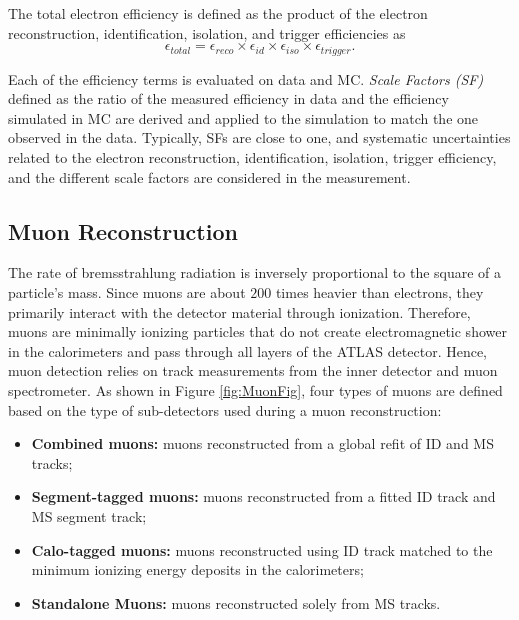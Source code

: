 The total electron efficiency is defined as the product of the electron reconstruction, identification, isolation, and trigger efficiencies as
\begin{equation}
    \epsilon_{total} = \epsilon_{reco} \times \epsilon_{id} \times \epsilon_{iso}\times \epsilon_{trigger}.   
\end{equation}

Each of the efficiency terms is evaluated on data and MC. \textit{Scale Factors (SF)} defined as the ratio of the measured efficiency in data and the efficiency simulated in MC are derived and applied to the simulation to match the one observed in the data. Typically, SFs are close to one, and systematic uncertainties related to the electron reconstruction, identification, isolation, trigger efficiency, and the different scale factors are considered in the measurement.

\subsection{Muon Reconstruction}
\label{subsec:ParticleRecon_Muon}
The rate of bremsstrahlung radiation is inversely proportional to the square of a particle's mass. Since muons are about $200$ times heavier than electrons, they primarily interact with the detector material through ionization. Therefore, muons are minimally ionizing particles that do not create electromagnetic shower in the calorimeters and pass through all layers of the ATLAS detector. Hence, muon detection relies on track measurements from the inner detector and muon spectrometer. As shown in Figure \ref{fig:MuonFig}, four types of muons are defined based on the type of sub-detectors used during a muon reconstruction:

\begin{itemize}
    \item{\textbf{Combined muons:} muons reconstructed from a global refit of ID and MS tracks;}
    \item{\textbf{Segment-tagged muons:} muons reconstructed from a fitted ID track and MS segment track;} 
    \item{\textbf{Calo-tagged muons:}  muons reconstructed using ID track matched to the minimum ionizing energy deposits in the calorimeters;}
    \item{\textbf{Standalone Muons:} muons reconstructed solely from MS tracks.}
\end{itemize}

